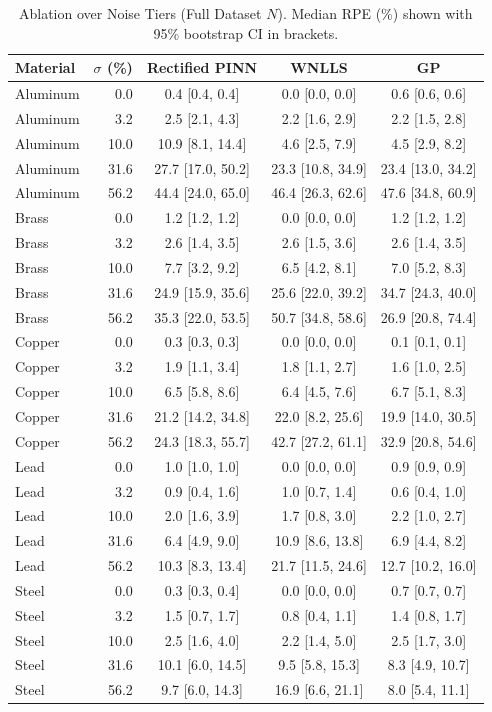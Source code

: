 \begin{table}[htbp]
\centering
\caption{Ablation over Noise Tiers (Full Dataset $N$). Median RPE (\%) shown with 95\% bootstrap CI in brackets.}
\label{tab:ablation_noise}
\small
\begin{tabular}{lr|ccc}
\toprule
Material & $\sigma$ (\%) & Rectified PINN & WNLLS & GP \\
\midrule
\midrule
Aluminum & 0.0 & 0.4 [0.4, 0.4] & 0.0 [0.0, 0.0] & 0.6 [0.6, 0.6] \\
Aluminum & 3.2 & 2.5 [2.1, 4.3] & 2.2 [1.6, 2.9] & 2.2 [1.5, 2.8] \\
Aluminum & 10.0 & 10.9 [8.1, 14.4] & 4.6 [2.5, 7.9] & 4.5 [2.9, 8.2] \\
Aluminum & 31.6 & 27.7 [17.0, 50.2] & 23.3 [10.8, 34.9] & 23.4 [13.0, 34.2] \\
Aluminum & 56.2 & 44.4 [24.0, 65.0] & 46.4 [26.3, 62.6] & 47.6 [34.8, 60.9] \\
\midrule
Brass & 0.0 & 1.2 [1.2, 1.2] & 0.0 [0.0, 0.0] & 1.2 [1.2, 1.2] \\
Brass & 3.2 & 2.6 [1.4, 3.5] & 2.6 [1.5, 3.6] & 2.6 [1.4, 3.5] \\
Brass & 10.0 & 7.7 [3.2, 9.2] & 6.5 [4.2, 8.1] & 7.0 [5.2, 8.3] \\
Brass & 31.6 & 24.9 [15.9, 35.6] & 25.6 [22.0, 39.2] & 34.7 [24.3, 40.0] \\
Brass & 56.2 & 35.3 [22.0, 53.5] & 50.7 [34.8, 58.6] & 26.9 [20.8, 74.4] \\
\midrule
Copper & 0.0 & 0.3 [0.3, 0.3] & 0.0 [0.0, 0.0] & 0.1 [0.1, 0.1] \\
Copper & 3.2 & 1.9 [1.1, 3.4] & 1.8 [1.1, 2.7] & 1.6 [1.0, 2.5] \\
Copper & 10.0 & 6.5 [5.8, 8.6] & 6.4 [4.5, 7.6] & 6.7 [5.1, 8.3] \\
Copper & 31.6 & 21.2 [14.2, 34.8] & 22.0 [8.2, 25.6] & 19.9 [14.0, 30.5] \\
Copper & 56.2 & 24.3 [18.3, 55.7] & 42.7 [27.2, 61.1] & 32.9 [20.8, 54.6] \\
\midrule
Lead & 0.0 & 1.0 [1.0, 1.0] & 0.0 [0.0, 0.0] & 0.9 [0.9, 0.9] \\
Lead & 3.2 & 0.9 [0.4, 1.6] & 1.0 [0.7, 1.4] & 0.6 [0.4, 1.0] \\
Lead & 10.0 & 2.0 [1.6, 3.9] & 1.7 [0.8, 3.0] & 2.2 [1.0, 2.7] \\
Lead & 31.6 & 6.4 [4.9, 9.0] & 10.9 [8.6, 13.8] & 6.9 [4.4, 8.2] \\
Lead & 56.2 & 10.3 [8.3, 13.4] & 21.7 [11.5, 24.6] & 12.7 [10.2, 16.0] \\
\midrule
Steel & 0.0 & 0.3 [0.3, 0.4] & 0.0 [0.0, 0.0] & 0.7 [0.7, 0.7] \\
Steel & 3.2 & 1.5 [0.7, 1.7] & 0.8 [0.4, 1.1] & 1.4 [0.8, 1.7] \\
Steel & 10.0 & 2.5 [1.6, 4.0] & 2.2 [1.4, 5.0] & 2.5 [1.7, 3.0] \\
Steel & 31.6 & 10.1 [6.0, 14.5] & 9.5 [5.8, 15.3] & 8.3 [4.9, 10.7] \\
Steel & 56.2 & 9.7 [6.0, 14.3] & 16.9 [6.6, 21.1] & 8.0 [5.4, 11.1] \\
\bottomrule
\end{tabular}
\end{table}
